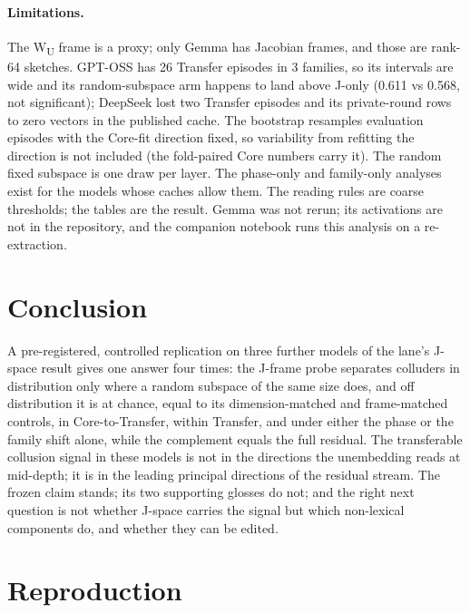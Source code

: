 \documentclass[11pt,a4paper]{article}
\begin{document}
\paragraph{Limitations.} The W\textsubscript{U} frame is a proxy; only Gemma has Jacobian frames, and those are rank-64 sketches. GPT-OSS has 26 Transfer episodes in 3 families, so its intervals are wide and its random-subspace arm happens to land above J-only (0.611 vs 0.568, not significant); DeepSeek lost two Transfer episodes and its private-round rows to zero vectors in the published cache. The bootstrap resamples evaluation episodes with the Core-fit direction fixed, so variability from refitting the direction is not included (the fold-paired Core numbers carry it). The random fixed subspace is one draw per layer. The phase-only and family-only analyses exist for the models whose caches allow them. The reading rules are coarse thresholds; the tables are the result. Gemma was not rerun; its activations are not in the repository, and the companion notebook runs this analysis on a re-extraction.

\section{Conclusion}

A pre-registered, controlled replication on three further models of the lane's J-space result gives one answer four times: the J-frame probe separates colluders in distribution only where a random subspace of the same size does, and off distribution it is at chance, equal to its dimension-matched and frame-matched controls, in Core-to-Transfer, within Transfer, and under either the phase or the family shift alone, while the complement equals the full residual. The transferable collusion signal in these models is not in the directions the unembedding reads at mid-depth; it is in the leading principal directions of the residual stream. The frozen claim stands; its two supporting glosses do not; and the right next question is not whether J-space carries the signal but which non-lexical components do, and whether they can be edited.

\section*{Reproduction}
\end{document}

